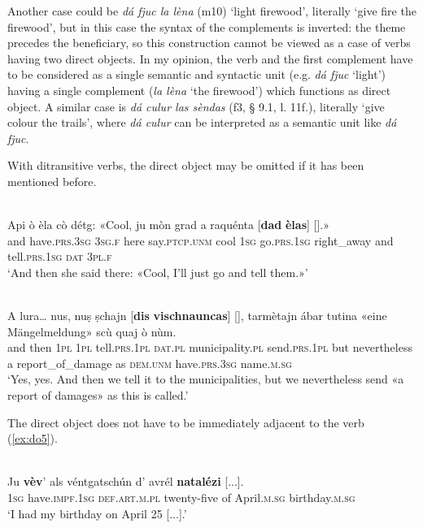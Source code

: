 Another case could be \textit{dá fjuc la lèna} (m10) `light firewood', literally `give fire the firewood', but in this case the syntax of the complements is inverted: the theme precedes the beneficiary, so this construction cannot be viewed as a case of verbs having two direct objects. In my opinion, the verb and the first complement have to be considered as a single semantic and syntactic unit (e.g. \textit{dá fjuc} `light') having a single complement (\textit{la lèna} `the firewood') which functions as direct object. A similar case is \textit{dá culur las sèndas} (f3, § 9.1, l. 11f.), literally `give colour the trails', where \textit{dá culur} can be interpreted as a semantic unit like \textit{dá fjuc}.

With ditransitive verbs, the direct object may be omitted if it has been mentioned before.

\ea\label{}
\\
\gll    Api ò èla cò détg: «Cool, ju mòn grad a raquénta [\textbf{dad} \textbf{èlas}] [\textbf{{\longrule}}].»\\
and have.\textsc{prs.3sg} \textsc{3sg.f} here say.\textsc{ptcp.unm} cool \textsc{1sg}  go.\textsc{prs.1sg} right\_away and tell.\textsc{prs.1sg} \textsc{dat} \textsc{3pl.f} {}\\
\glt `And then she said there: «Cool, I’ll just go and tell them.»'
\z

\ea\label{}
\\
\gll  A lura… nus, nuṣ ṣchajn [\textbf{dis} \textbf{vischnauncas}] [\textbf{{\longrule}}], tarmètajn ábar tutina «eine Mängelmeldung»\footnotemark{} scù quaj ò nùm.  \\
and then \textsc{1pl} \textsc{1pl} tell.\textsc{prs.1pl} \textsc{dat.pl} municipality.\textsc{pl} {} send.\textsc{prs.1pl} but nevertheless a report\_of\_damage as \textsc{dem.unm} have.\textsc{prs.3sg} name.\textsc{m.sg}\\
\glt `Yes, yes. And then we tell it to the municipalities, but we nevertheless send «a report of damages» as this is called.'
\z

The direct object does not have to be immediately adjacent to the verb (\ref{ex:do5}).

\ea
\label{ex:do5}
\\
	\gll Ju \textbf{vèv}’ als véntgatschún d’ avrél \textbf{natalézi} [...].   \\
\textsc{1sg} have.\textsc{impf.1sg} \textsc{def.art.m.pl} twenty-five of April.\textsc{m.sg} birthday.\textsc{m.sg} \\
\glt `I had my birthday on April 25 [...].'
\z


